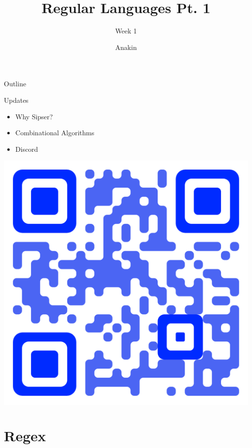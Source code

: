 \documentclass[aspectratio=169, handout]{beamer}
\title{Regular Languages Pt. 1}
\subtitle{Week 1}
\author{Anakin}
\date{}
\begin{document}

\begin{frame}
\titlepage
\end{frame}

\begin{frame}{Outline}
  \tableofcontents
\end{frame}

\begin{frame}{Updates}
  \begin{itemize}
    \item Why Sipser? \pause
    \item Combinational Algorithms \pause
    \item Discord
  \end{itemize}
  \hfill
  \includegraphics[scale=0.15]{sigma-code2.png}
\end{frame}

\section{Regex}
\frame{\sectionpage}
\end{document}
